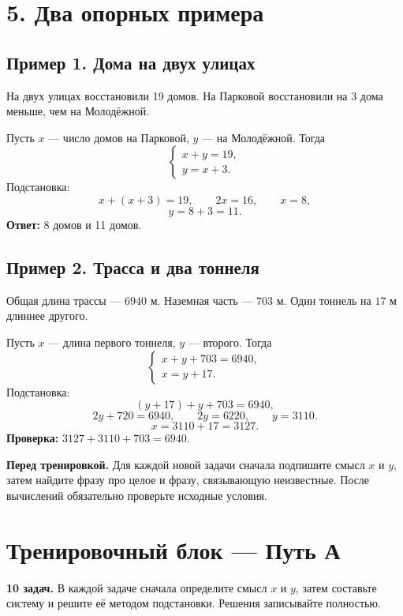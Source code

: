 \documentclass[a4paper,12pt]{article}
\newcommand{\sepLine}{\vspace{0.35em}{\color{accent}\hrule height 0.6pt}\vspace{0.8em}}
\begin{document}
\section*{5. Два опорных примера}
\sepLine

\subsection*{Пример 1. Дома на двух улицах}
На двух улицах восстановили 19 домов. На Парковой восстановили на 3 дома меньше, чем на Молодёжной.

Пусть $x$ --- число домов на Парковой, $y$ --- на Молодёжной. Тогда
\[
\begin{cases}
 x+y=19,\\
 y=x+3.
\end{cases}
\]
Подстановка:
\[
x+(x+3)=19,\qquad 2x=16,\qquad x=8,
\]
\[
y=8+3=11.
\]
\textbf{Ответ:} 8 домов и 11 домов.

\subsection*{Пример 2. Трасса и два тоннеля}
Общая длина трассы --- $6940$ м. Наземная часть --- $703$ м. Один тоннель на $17$ м длиннее другого.

Пусть $x$ --- длина первого тоннеля, $y$ --- второго. Тогда
\[
\begin{cases}
 x+y+703=6940,\\
 x=y+17.
\end{cases}
\]
Подстановка:
\[
(y+17)+y+703=6940,
\]
\[
2y+720=6940,\qquad 2y=6220,\qquad y=3110.
\]
\[
x=3110+17=3127.
\]
\textbf{Проверка:} $3127+3110+703=6940$.

\vspace{1em}
\textbf{Перед тренировкой.} Для каждой новой задачи сначала подпишите смысл $x$ и $y$, затем найдите фразу про целое и фразу, связывающую неизвестные. После вычислений обязательно проверьте исходные условия.

\clearpage

\section*{Тренировочный блок --- Путь А}
\sepLine
\textbf{10 задач.} В каждой задаче сначала определите смысл $x$ и $y$, затем составьте систему и решите её методом подстановки. Решения записывайте полностью.
\end{document}
